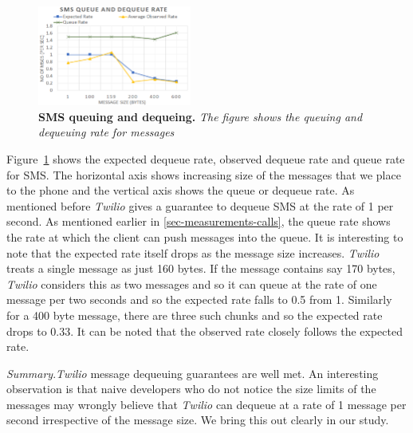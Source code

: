 \begin{figure} \centering
\includegraphics[width=0.45\textwidth]{graphs/sms.pdf}
\caption{\textbf{SMS queuing and dequeing.} {\footnotesize\textit{
The figure shows the queuing and dequeuing rate for messages
}}}
\label{fig:sms}
\end{figure}

Figure~\ref{fig:sms} shows the expected dequeue rate, observed dequeue rate and queue rate for SMS. The horizontal axis shows increasing size of the messages that we place to the phone and the vertical axis shows the queue or dequeue rate. As mentioned before \textit{Twilio} gives a guarantee to dequeue SMS at the rate of 1 per second. As mentioned earlier in \ref{sec-measurements-calls}, the queue rate shows the rate at which the client can push messages into the queue. It is interesting to note that the expected rate itself drops as the message size increases. \textit{Twilio} treats a single message as just 160 bytes. If the message contains say 170 bytes, \textit{Twilio} considers this as two messages and so it can queue at the rate of one message per two seconds and so the expected rate falls to 0.5 from 1. Similarly for a 400 byte message, there are three such chunks and so the expected rate drops to 0.33. It can be noted that the observed rate closely follows the expected rate. 

\textit{Summary}.\textit{Twilio} message dequeuing guarantees are well met. An interesting observation is that naive developers who do not notice the size limits of the messages may wrongly believe that \textit{Twilio} can dequeue at a rate of 1 message per second irrespective of the message size. We bring this out clearly in our study. 




